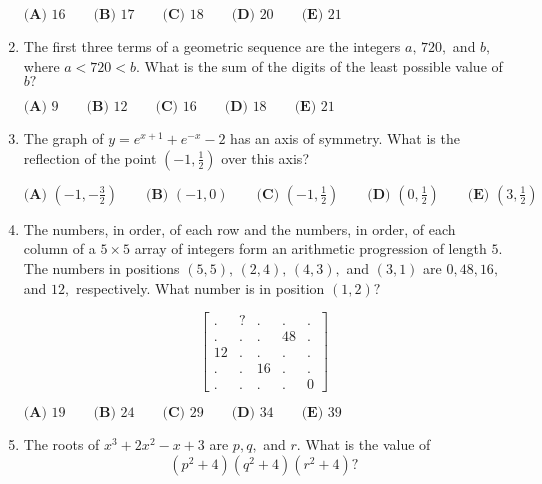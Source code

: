 \documentclass{article}
\begin{document}
\begin{enumerate}[label=\arabic*., itemsep=0.5em]
\(\textbf{(A) }16\qquad\textbf{(B) }17\qquad\textbf{(C) }18\qquad\textbf{(D) }20\qquad\textbf{(E) }21\)\par \vspace{0.5em}\item The first three terms of a geometric sequence are the integers \(a,\,720,\) and \(b,\) where \(a<720<b.\) What is the sum of the digits of the least possible value of \(b?\)

\(\textbf{(A) } 9 \qquad \textbf{(B) } 12 \qquad \textbf{(C) } 16 \qquad \textbf{(D) } 18 \qquad \textbf{(E) } 21\)\par \vspace{0.5em}\item The graph of \(y=e^{x+1}+e^{-x}-2\) has an axis of symmetry. What is the reflection of the point \((-1,\tfrac{1}{2})\) over this axis?

\(\textbf{(A) }\left(-1,-\frac{3}{2}\right)\qquad\textbf{(B) }(-1,0)\qquad\textbf{(C) }\left(-1,\tfrac{1}{2}\right)\qquad\textbf{(D) }\left(0,\frac{1}{2}\right)\qquad\textbf{(E) }\left(3,\frac{1}{2}\right)\)\par \vspace{0.5em}\item The numbers, in order, of each row and the numbers, in order, of each column of a \(5 \times 5\) array of integers form an arithmetic progression of length \(5{.}\) The numbers in positions \((5, 5), \,(2,4),\,(4,3),\) and \((3, 1)\) are \(0, 48, 16,\) and \(12{,}\) respectively. What number is in position \((1, 2)?\)

\begin{equation*}
\begin{bmatrix} . & ? &.&.&. \\ .&.&.&48&.\\ 12&.&.&.&.\\ .&.&16&.&.\\ .&.&.&.&0\end{bmatrix}
\end{equation*}

\(\textbf{(A) } 19 \qquad \textbf{(B) } 24 \qquad \textbf{(C) } 29 \qquad \textbf{(D) } 34 \qquad \textbf{(E) } 39\)\par \vspace{0.5em}\item The roots of \(x^3 + 2x^2 - x + 3\) are \(p, q,\) and \(r.\) What is the value of 
\begin{equation*}
(p^2 + 4)(q^2 + 4)(r^2 + 4)?
\end{equation*}


\end{enumerate}
\end{document}
